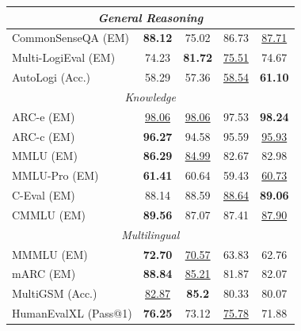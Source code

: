 \documentclass[table]{gtech}
\theoremstyle{definition}
\begin{document}
\begin{table}[h]
{\begin{tabular}{lcccc}
\midrule
\multicolumn{5}{c}{\textit{General Reasoning}} \\
\midrule
CommonSenseQA (EM) & \textbf{88.12} & 75.02 & 86.73 & \underline{87.71} \\
Multi-LogiEval (EM) & 74.23 & \textbf{81.72} & \underline{75.51} & 74.67 \\
AutoLogi (Acc.) & 58.29 & 57.36 & \underline{58.54} & \textbf{61.10}\\
\midrule
\multicolumn{5}{c}{\textit{Knowledge}} \\
\midrule
ARC-e (EM) & \underline{98.06} & \underline{98.06} & 97.53 & \textbf{98.24}\\
ARC-c (EM) & \textbf{96.27} & 94.58 & 95.59 & \underline{95.93} \\
MMLU (EM) & \textbf{86.29} & \underline{84.99} & 82.67 & 82.98\\
MMLU-Pro (EM) & \textbf{61.41} & 60.64 & 59.43 & \underline{60.73}\\
C-Eval (EM) & 88.14 & 88.59 & \underline{88.64} & \textbf{89.06}\\
CMMLU (EM) & \textbf{89.56} & 87.07 & 87.41 & \underline{87.90} \\
\midrule
\multicolumn{5}{c}{\textit{Multilingual}} \\
\midrule
MMMLU (EM) & \textbf{72.70} & \underline{70.57} & 63.83 & 62.76\\
mARC (EM) & \textbf{88.84} & \underline{85.21} & 81.87 & 82.07 \\
MultiGSM (Acc.) & \underline{82.87} & \textbf{85.2} & 80.33 & 80.07 \\
HumanEvalXL (Pass@1) & \textbf{76.25} & 73.12 & \underline{75.78} & 71.88 \\
\bottomrule
\end{tabular}}
\end{table}
\end{document}

